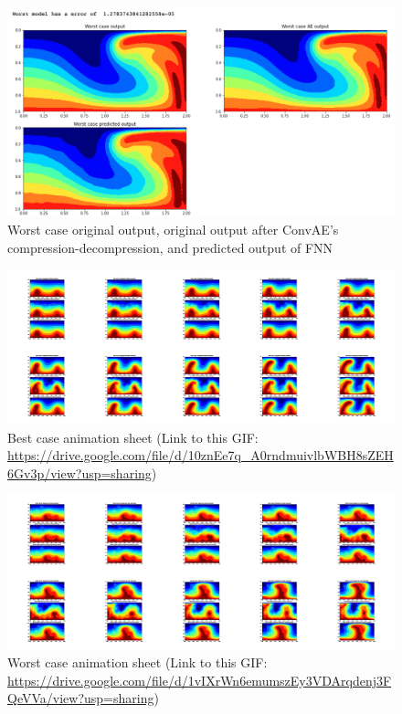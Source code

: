 \begin{figure}[H]
    \caption{Worst case original output, original output after ConvAE's compression-decompression, and predicted output of FNN}
    \includegraphics[scale=0.5]{Report LaTeX/figures/mantle_convection_images/larger_dataset_interpolated/FNN_Worst.png}
\end{figure}


\begin{figure}[H]
    \centering
    \caption{Best case animation sheet (Link to this GIF: \url{https://drive.google.com/file/d/10znEe7q_A0rndmuivlbWBH8sZEH6Gv3p/view?usp=sharing})}
    \includegraphics[scale=0.10]{Report LaTeX/figures/mantle_convection_images/larger_dataset_interpolated/FNN_Best_GIF_sheet.png}
\end{figure}

\begin{figure}[H]
    \centering
    \caption{Worst case animation sheet (Link to this GIF: 
    \url{https://drive.google.com/file/d/1vIXrWn6emumszEy3VDArqdenj3FQeVVa/view?usp=sharing})}
    \includegraphics[scale=0.10]{Report LaTeX/figures/mantle_convection_images/larger_dataset_interpolated/FNN_Worst_GIF_sheet.png}
\end{figure}


